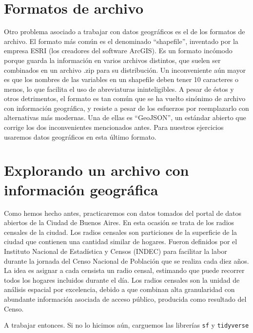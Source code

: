 \documentclass[spanish,]{book}
\begin{document}
\hypertarget{formatos-de-archivo}{%
\section{Formatos de archivo}\label{formatos-de-archivo}}

Otro problema asociado a trabajar con datos geográficos es el de los formatos de archivo. El formato más común es el denominado ``shapefile'', inventado por la empresa ESRI (los creadores del software ArcGIS). Es un formato incómodo porque guarda la información en varios archivos distintos, que suelen ser combinados en un archivo .zip para su distribución. Un inconveniente aún mayor es que los nombres de las variables en un shapefile deben tener 10 caracteres o menos, lo que facilita el uso de abreviaturas ininteligibles. A pesar de éstos y otros detrimentos, el formato es tan común que se ha vuelto sinónimo de archivo con información geográfica, y resiste a pesar de los esfuerzos por reemplazarlo con alternativas más modernas. Una de ellas es ``GeoJSON'', un estándar abierto que corrige los dos inconvenientes mencionados antes. Para nuestros ejercicios usaremos datos geográficos en esta último formato.

\hypertarget{explorando-un-archivo-con-informaciuxf3n-geogruxe1fica}{%
\section{Explorando un archivo con información geográfica}\label{explorando-un-archivo-con-informaciuxf3n-geogruxe1fica}}

Como hemos hecho antes, practicaremos con datos tomados del portal de datos abiertos de la Ciudad de Buenos Aires. En esta ocasión se trata de los radios censales de la ciudad. Los radios censales son particiones de la superficie de la ciudad que contienen una cantidad similar de hogares. Fueron definidos por el Instituto Nacional de Estadística y Censos (INDEC) para facilitar la labor durante la jornada del Censo Nacional de Población que se realiza cada diez años. La idea es asignar a cada censista un radio censal, estimando que puede recorrer todos los hogares incluidos durante el día. Los radios censales son la unidad de análisis espacial por excelencia, debido a que combinan alta granularidad con abundante información asociada de acceso público, producida como resultado del Censo.

A trabajar entonces. Si no lo hicimos aún, carguemos las librerías \texttt{sf} y \texttt{tidyverse}
\end{document}
